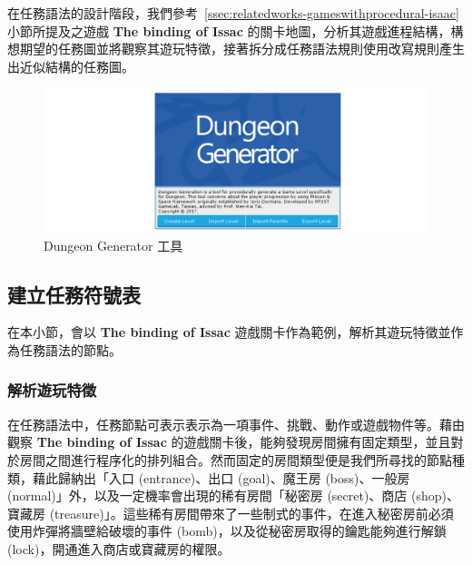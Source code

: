 在任務語法的設計階段，我們參考~\ref{ssec:relatedworks-gameswithprocedural-isaac} 小節所提及之遊戲 \textbf{The binding of Issac} 的關卡地圖，分析其遊戲進程結構，構想期望的任務圖並將觀察其遊玩特徵，接著拆分成任務語法規則使用改寫規則產生出近似結構的任務圖。

\begin{figure}[ht]
  \begin{center}
    \includegraphics[width=1.0\textwidth]{figures/Dungeon_Generator_工具.png}
    \caption{Dungeon Generator 工具} 
    \label{fig:dungeon-generator}
  \end{center}
\end{figure}

\subsection{建立任務符號表}
\label{ssec:method-missiongrammars-alphabet}

在本小節，會以 \textbf{The binding of Issac} 遊戲關卡作為範例，解析其遊玩特徵並作為任務語法的節點。

\subsubsection{解析遊玩特徵}
\label{sssec:method-missiongrammars-alphabet-extractpatterns}

在任務語法中，任務節點可表示表示為一項事件、挑戰、動作或遊戲物件等。藉由觀察 \textbf{The binding of Issac} 的遊戲關卡後，能夠發現房間擁有固定類型，並且對於房間之間進行程序化的排列組合。然而固定的房間類型便是我們所尋找的節點種類，藉此歸納出「入口 (entrance)、出口 (goal)、魔王房 (boss)、一般房 (normal)」外，以及一定機率會出現的稀有房間「秘密房 (secret)、商店 (shop)、寶藏房 (treasure)」。這些稀有房間帶來了一些制式的事件，在進入秘密房前必須使用炸彈將牆壁給破壞的事件 (bomb)，以及從秘密房取得的鑰匙能夠進行解鎖 (lock)，開通進入商店或寶藏房的權限。


